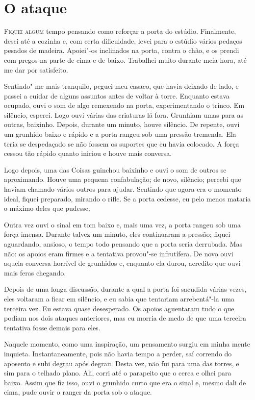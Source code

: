 \clearpage

\chapter{O ataque}

\textsc{Fiquei algum} tempo pensando como reforçar a porta do estúdio. Finalmente, desci até a cozinha e, com certa dificuldade,
levei para o estúdio vários pedaços pesados de madeira. Apoiei"-os inclinados na porta, contra o chão, e os prendi com
pregos na parte de cima e de baixo. Trabalhei muito durante meia hora, até me dar por satisfeito.

Sentindo"-me mais tranquilo, peguei meu casaco, que havia deixado de lado, e passei a cuidar de alguns assuntos
antes de voltar à torre. Enquanto estava ocupado, ouvi o som de algo remexendo na porta, experimentando o trinco. Em
silêncio, esperei. Logo ouvi várias das criaturas lá fora. Grunhiam umas para as outras, baixinho. Depois, durante um
minuto, houve silêncio. De repente, ouvi um grunhido baixo e rápido e a porta rangeu sob uma pressão tremenda. Ela
teria se despedaçado se não fossem os suportes que eu havia colocado. A força cessou tão rápido quanto iniciou e houve
mais conversa.

Logo depois, uma das Coisas guinchou baixinho e ouvi o som de outros se aproximando. Houve uma pequena confabulação;
de novo, silêncio; percebi que haviam chamado vários outros para ajudar. Sentindo que agora era o momento ideal,
fiquei preparado, mirando o rifle. Se a porta cedesse, eu pelo menos mataria o máximo deles que pudesse.

Outra vez ouvi o sinal em tom baixo e, mais uma vez, a porta rangeu sob uma força imensa. Durante talvez um minuto,
eles continuaram a pressão; fiquei aguardando, ansioso, o tempo todo pensando que a porta seria derrubada. Mas não: os
apoios eram firmes e a tentativa provou"-se infrutífera. De novo ouvi aquela conversa horrível de grunhidos e,
enquanto ela durou, acredito que ouvi mais feras chegando.

Depois de uma longa discussão, durante a qual a porta foi sacudida várias vezes, eles voltaram a ficar em silêncio, e
eu sabia que tentariam arrebentá"-la uma terceira vez. Eu estava quase desesperado. Os apoios aguentaram tudo o que
podiam nos dois ataques anteriores, mas eu morria de medo de que uma terceira tentativa fosse demais para eles.

Naquele momento, como uma inspiração, um pensamento surgiu em minha mente inquieta. Instantaneamente, pois não havia
tempo a perder, saí correndo do aposento e subi degrau após degrau. Desta vez, não fui para uma das torres, e sim para
o telhado plano. Ali, corri até o parapeito que o cerca e olhei para baixo. Assim que fiz isso, ouvi o grunhido curto
que era o sinal e, mesmo dali de cima, pude ouvir o ranger da porta sob o ataque.

